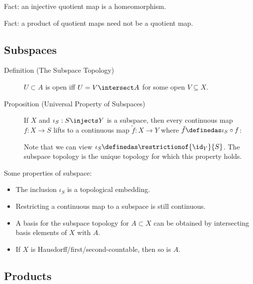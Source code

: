 Fact: an injective quotient map is a homeomorphism.

Fact: a product of quotient maps need not be a quotient map.

\hypertarget{subspaces}{%
\subsection{Subspaces}\label{subspaces}}

\begin{description}
\item[Definition (The Subspace Topology)]
\(U\subset A\) is open iff \(U = V\intersect A\) for some open
\(V\subseteq X\).
\item[Proposition (Universal Property of Subspaces)]
If \(X\) and \(\iota_S: S\injects Y\) is a subspace, then every
continuous map \(f: X\to S\) lifts to a continuous map
\(\tilde f: X\to Y\) where \(\tilde f \definedas \iota_S \circ f\):

\begin{center}
\end{center}

Note that we can view \(\iota_S \definedas \restrictionof{\id_Y}{S}\).
The subspace topology is the unique topology for which this property
holds.
\end{description}

Some properties of subspace:

\begin{itemize}
\tightlist
\item
  The inclusion \(\iota_S\) is a topological embedding.
\item
  Restricting a continuous map to a subspace is still continuous.
\item
  A basis for the subspace topology for \(A\subset X\) can be obtained
  by intersecting basis elements of \(X\) with \(A\).
\item
  If \(X\) is Hausdorff/first/second-countable, then so is \(A\).
\end{itemize}

\hypertarget{products}{%
\subsection{Products}\label{products}}

